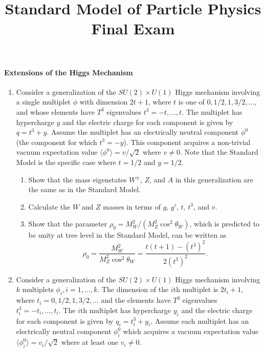 \documentclass[letterpaper,11pt]{article}
\title{Standard Model of Particle Physics \\ Final Exam}
\begin{document}
\maketitle

\paragraph*{Extensions of the Higgs Mechanism}
\begin{enumerate}
  \item \label{higgs:single_multiplet}
  Consider a generalization of the $SU(2) \times U(1)$ Higgs mechanism involving a single multiplet $\phi$ with dimension $2 t + 1$, where $t$ is one of $0, 1/2, 1, 3/2, \ldots$, and whose elements have $T^3$ eigenvalues $t^3 = -t, \ldots, t$. The multiplet has hypercharge $y$ and the electric charge for each component is given by $q = t^3 + y$. Assume the multiplet has an electrically neutral component $\phi^0$ (the component for which $t^3 = -y$). This component acquires a non-trivial vacuum expectation value $\langle \phi^0 \rangle = v/\sqrt{2}$ where $v \ne 0$. Note that the Standard Model is the specific case where $t = 1/2$ and $y = 1/2$.
  \begin{enumerate}
    \item Show that the mass eigenstates $W^\pm$, $Z$, and $A$ in this generalization are the same as in the Standard Model.
    \item Calculate the $W$ and $Z$ masses in terms of $g$, $g'$, $t$, $t^3$, and $v$.
    \item Show that the parameter $\rho_0 = M_W^2 / (M_Z^2 \cos^2\theta_W)$, which is predicted to be unity at tree level in the Standard Model, can be written as
    \begin{equation}
      \rho_0 =  \frac{M_W^2}{M_Z^2 \cos^2\theta_W} = \frac{t(t+1) - (t^3)^2}{2 (t^3)^2}.
    \end{equation}
  \end{enumerate}
  \item \label{higgs:many_multiplets}
  Consider a generalization of the $SU(2) \times U(1)$ Higgs mechanism involving $k$ multiplets $\phi_i, i = 1, \ldots, k$. The dimension of the $i$th multiplet is $2 t_i + 1$, where $t_i = 0, 1/2, 1, 3/2, \ldots$ and the elements have $T^3$ eigenvalues $t^3_i = -t_i, \ldots, t_i$. The $i$th multiplet has hypercharge $y_i$ and the electric charge for each component is given by $q_i = t^3_i + y_i$. Assume each multiplet has an electrically neutral component $\phi^0_i$ which acquires a vacuum expectation value $\langle \phi^0_i \rangle = v_i/\sqrt{2}$ where at least one $v_i \ne 0$.

\end{enumerate}
\end{document}
